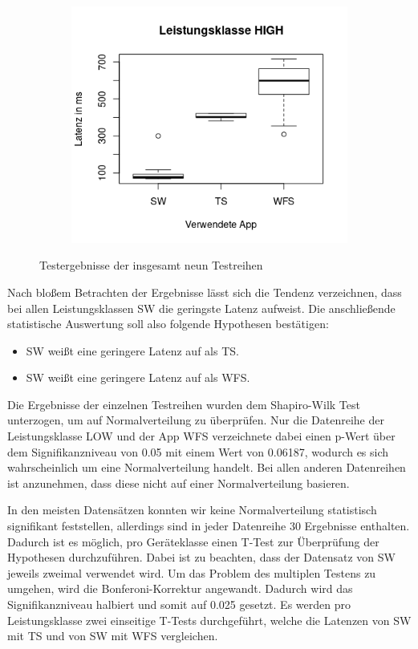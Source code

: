\begin{figure}[H]
\begin{subfigure}[b]{0.5\textwidth}
\end{subfigure}
\begin{subfigure}[b]{0.5\textwidth}
\includegraphics[width=\textwidth]{img/boxplothigh.png}
\end{subfigure}
\caption{Testergebnisse der insgesamt neun Testreihen}
\label{boxplots}
\end{figure}

Nach bloßem Betrachten der Ergebnisse lässt sich die Tendenz verzeichnen, dass bei allen Leistungsklassen SW die geringste Latenz aufweist. Die anschließende statistische Auswertung soll also folgende Hypothesen bestätigen:

\begin{itemize}
\item SW weißt eine geringere Latenz auf als TS.
\item SW weißt eine geringere Latenz auf als WFS.
\end{itemize}

Die Ergebnisse der einzelnen Testreihen wurden dem Shapiro-Wilk Test unterzogen, um auf Normalverteilung zu überprüfen. Nur die Datenreihe der Leistungsklasse LOW und der App WFS verzeichnete dabei einen p-Wert über dem Signifikanzniveau von 0.05 mit einem Wert von 0.06187, wodurch es sich wahrscheinlich um eine Normalverteilung handelt. Bei allen anderen Datenreihen ist anzunehmen, dass diese nicht auf einer Normalverteilung basieren.

In den meisten Datensätzen konnten wir keine Normalverteilung statistisch signifikant feststellen, allerdings sind in jeder Datenreihe 30 Ergebnisse enthalten. Dadurch ist es möglich, pro Geräteklasse einen T-Test zur Überprüfung der Hypothesen durchzuführen. Dabei ist zu beachten, dass der Datensatz von SW jeweils zweimal verwendet wird. Um das Problem des multiplen Testens zu umgehen, wird die Bonferoni-Korrektur angewandt. Dadurch wird das Signifikanzniveau halbiert und somit auf 0.025 gesetzt. Es werden pro Leistungsklasse zwei einseitige T-Tests durchgeführt, welche die Latenzen von SW mit TS und von SW mit WFS vergleichen.


